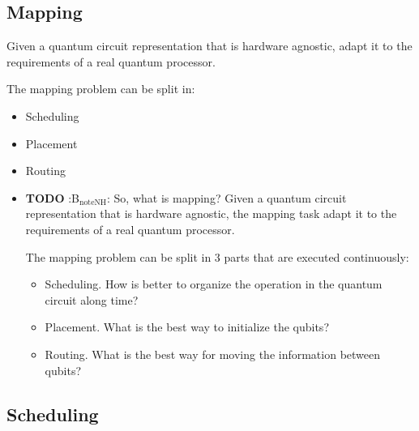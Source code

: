 \subsection*{Mapping}
\label{sec:org82e3b76}

Given a quantum circuit representation that is hardware agnostic, adapt it to the requirements of a real quantum processor.


The mapping problem can be split in:

\begin{itemize}
\item Scheduling
\item Placement
\item Routing
\end{itemize}

\begin{itemize}
\item {\bfseries\sffamily TODO} :B\(_{\text{noteNH}}\):
\label{sec:orgd36b413}
So, what is mapping?
Given a quantum circuit representation that is hardware agnostic, the mapping task adapt it to the requirements of a real quantum processor.

The mapping problem can be split in 3 parts that are executed continuously:

\begin{itemize}
\item Scheduling. How is better to organize the operation in the quantum circuit along time?
\item Placement. What is the best way to initialize the qubits?
\item Routing. What is the best way for moving the information between qubits?
\end{itemize}
\end{itemize}

\subsection*{Scheduling}
\label{sec:org5e32f43}

